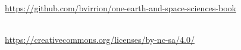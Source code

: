 \thispagestyle{empty}
\vspace*{\fill}
\begin{center}
\omcolophonsource\\[2pt]
\url{https://github.com/bvirrion/one-earth-and-space-sciences-book}

\bigskip
\omcolophonlicense\\[2pt]
\url{https://creativecommons.org/licenses/by-nc-sa/4.0/}\\[6pt]
\omcolophoncredit
\end{center}
\vspace*{\fill}
\clearpage
